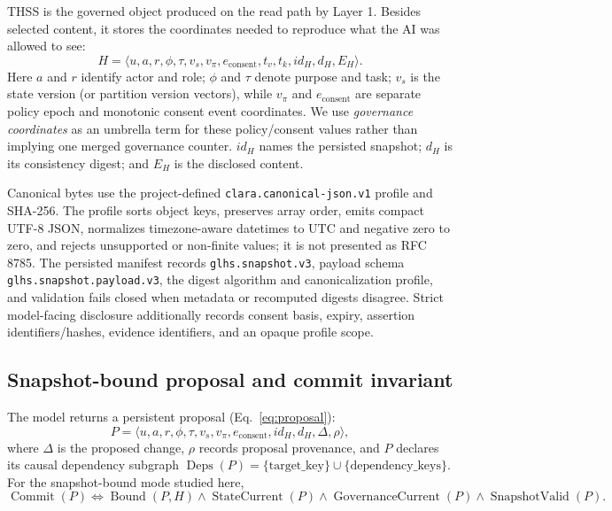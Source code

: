 \documentclass[11pt]{article}
\begin{document}
THSS is the governed object produced on the read path by Layer 1. Besides selected content, it stores the coordinates needed to reproduce what the AI was allowed to see:
\begin{equation}
H=\langle u,a,r,\phi,\tau,v_s,v_{\pi},e_{\text{consent}},t_v,t_k,id_H,d_H,E_H\rangle.
\label{eq:thss}
\end{equation}
Here $a$ and $r$ identify actor and role; $\phi$ and $\tau$ denote purpose and task; $v_s$ is the state version (or partition version vectors), while $v_{\pi}$ and $e_{\text{consent}}$ are separate policy epoch and monotonic consent event coordinates. We use \emph{governance coordinates} as an umbrella term for these policy/consent values rather than implying one merged governance counter. $id_H$ names the persisted snapshot; $d_H$ is its consistency digest; and $E_H$ is the disclosed content.

Canonical bytes use the project-defined \texttt{clara.canonical-json.v1} profile and SHA-256. The profile sorts object keys, preserves array order, emits compact UTF-8 JSON, normalizes timezone-aware datetimes to UTC and negative zero to zero, and rejects unsupported or non-finite values; it is not presented as RFC 8785. The persisted manifest records \texttt{glhs.snapshot.v3}, payload schema \texttt{glhs.snapshot.payload.v3}, the digest algorithm and canonicalization profile, and validation fails closed when metadata or recomputed digests disagree. Strict model-facing disclosure additionally records consent basis, expiry, assertion identifiers/hashes, evidence identifiers, and an opaque profile scope.

\subsection{Snapshot-bound proposal and commit invariant}
The model returns a persistent proposal (Eq.~\ref{eq:proposal}):
\begin{equation}
P=\langle u,a,r,\phi,\tau,v_s,v_{\pi},e_{\text{consent}},id_H,d_H,\Delta,\rho\rangle,
\label{eq:proposal}
\end{equation}
where $\Delta$ is the proposed change, $\rho$ records proposal provenance, and $P$ declares its causal dependency subgraph $\operatorname{Deps}(P) = \{ \text{target\_key} \} \cup \{ \text{dependency\_keys} \}$. For the snapshot-bound mode studied here,
\begin{equation}
\operatorname{Commit}(P) \Leftrightarrow
\operatorname{Bound}(P,H) \land
\operatorname{StateCurrent}(P) \land
\operatorname{GovernanceCurrent}(P) \land
\operatorname{SnapshotValid}(P).
\label{eq:commit}
\end{equation}
\end{document}
